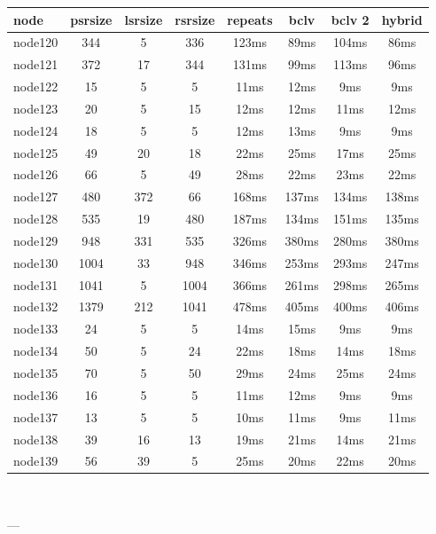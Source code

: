 \begin{tabular}{|l|c|c|c|c|c|c|c|}
\hline node & psrsize & lsrsize & rsrsize   & repeats & bclv & bclv 2 & hybrid\\
    \hline node120 & 344 & 5 & 336 & 123ms & 89ms & 104ms & 86ms\\
    \hline node121 & 372 & 17 & 344 & 131ms & 99ms & 113ms & 96ms\\
    \hline node122 & 15 & 5 & 5 & 11ms & 12ms & 9ms & 9ms\\
    \hline node123 & 20 & 5 & 15 & 12ms & 12ms & 11ms & 12ms\\
    \hline node124 & 18 & 5 & 5 & 12ms & 13ms & 9ms & 9ms\\
    \hline node125 & 49 & 20 & 18 & 22ms & 25ms & 17ms & 25ms\\
    \hline node126 & 66 & 5 & 49 & 28ms & 22ms & 23ms & 22ms\\
    \hline node127 & 480 & 372 & 66 & 168ms & 137ms & 134ms & 138ms\\
    \hline node128 & 535 & 19 & 480 & 187ms & 134ms & 151ms & 135ms\\
    \hline node129 & 948 & 331 & 535 & 326ms & 380ms & 280ms & 380ms\\
    \hline node130 & 1004 & 33 & 948 & 346ms & 253ms & 293ms & 247ms\\
    \hline node131 & 1041 & 5 & 1004 & 366ms & 261ms & 298ms & 265ms\\
    \hline node132 & 1379 & 212 & 1041 & 478ms & 405ms & 400ms & 406ms\\
    \hline node133 & 24 & 5 & 5 & 14ms & 15ms & 9ms & 9ms\\
    \hline node134 & 50 & 5 & 24 & 22ms & 18ms & 14ms & 18ms\\
    \hline node135 & 70 & 5 & 50 & 29ms & 24ms & 25ms & 24ms\\
    \hline node136 & 16 & 5 & 5 & 11ms & 12ms & 9ms & 9ms\\
    \hline node137 & 13 & 5 & 5 & 10ms & 11ms & 9ms & 11ms\\
    \hline node138 & 39 & 16 & 13 & 19ms & 21ms & 14ms & 21ms\\
    \hline node139 & 56 & 39 & 5 & 25ms & 20ms & 22ms & 20ms\\

\hline
\end{tabular} \

---


